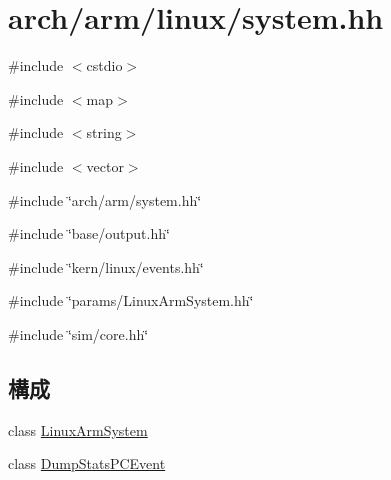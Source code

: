 \hypertarget{arch_2arm_2linux_2system_8hh}{
\section{arch/arm/linux/system.hh}
\label{arch_2arm_2linux_2system_8hh}
}
{\ttfamily \#include $<$cstdio$>$}\par
{\ttfamily \#include $<$map$>$}\par
{\ttfamily \#include $<$string$>$}\par
{\ttfamily \#include $<$vector$>$}\par
{\ttfamily \#include \char`\"{}arch/arm/system.hh\char`\"{}}\par
{\ttfamily \#include \char`\"{}base/output.hh\char`\"{}}\par
{\ttfamily \#include \char`\"{}kern/linux/events.hh\char`\"{}}\par
{\ttfamily \#include \char`\"{}params/LinuxArmSystem.hh\char`\"{}}\par
{\ttfamily \#include \char`\"{}sim/core.hh\char`\"{}}\par
\subsection*{構成}
\begin{DoxyCompactItemize}
\item 
class \hyperlink{classLinuxArmSystem}{LinuxArmSystem}
\item 
class \hyperlink{classDumpStatsPCEvent}{DumpStatsPCEvent}
\end{DoxyCompactItemize}
